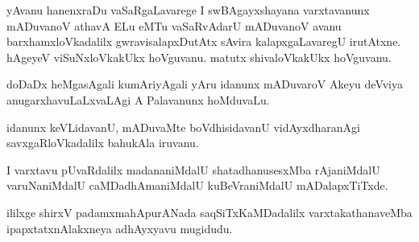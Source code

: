 \documentclass{article}
\begin{document}
\begin{mn}
yAvanu  hanenxraDu  vaSaRgaLavarege  I  swBAgayxshayana  varxtavanunx  mADuvanoV  athavA  ELu  eMTu  
vaSaRvAdarU  mADuvanoV  avanu  barxhamxloVkadalilx  gwravisalapxDutAtx  sAvira  kalapxgaLavaregU  
irutAtxne.  hAgeyeV  viSuNxloVkakUkx  hoVguvanu.  matutx  shivaloVkakUkx  hoVguvanu.  
\end{mn}

\begin{mn}
doDaDx  heMgasAgali  kumAriyAgali  yAru  idanunx  mADuvaroV  Akeyu  deVviya  anugarxhavuLaLxvaLAgi  
A  Palavanunx  hoMduvaLu.
\end{mn}

\begin{mn}
idanunx  keVLidavanU,  mADuvaMte  boVdhisidavanU  vidAyxdharanAgi  savxgaRloVkadalilx  bahukAla  iruvanu.
\end{mn}

\begin{mn}
I varxtavu  pUvaRdalilx  madananiMdalU  shatadhanusesxMba  rAjaniMdalU  varuNaniMdalU  caMDadhAmaniMdalU  
kuBeVraniMdalU  mADalapxTiTxde.
\end{mn}

\begin{mn}
ililxge  shirxV  padamxmahApurANada  saqSiTxKaMDadalilx  varxtakathanaveMba  ipapxtatxnAlakxneya  adhAyxyavu  mugidudu.
\end{mn}

\begin{mn}
\end{mn}

\begin{mn}

\end{mn}

\begin{mn}

\end{mn}

\begin{mn}

\end{mn}

\begin{mn}

\end{mn}

\begin{mn}

\end{mn}
\end{document}
